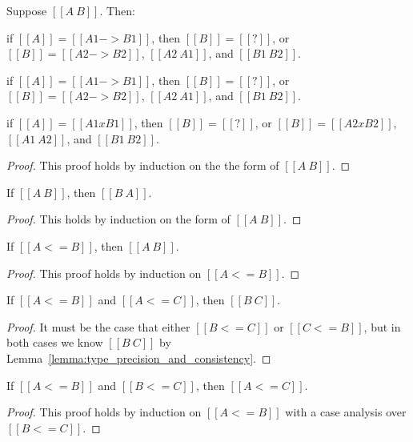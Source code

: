 \begin{lemma}
  \label{lemma:inversion_of_type_consistency}
  Suppose $[[A ~ B]]$. Then:
  \begin{enumR}\small
  \item if $[[A]] = [[A1 -> B1]]$, then $[[B]] = [[?]]$, or
    $[[B]] = [[A2 -> B2]]$, $[[A2 ~ A1]]$, and $[[B1 ~ B2]]$.
  \item if $[[A]] = [[A1 -> B1]]$, then $[[B]] = [[?]]$, or
    $[[B]] = [[A2 -> B2]]$, $[[A2 ~ A1]]$, and $[[B1 ~ B2]]$.
  \item if $[[A]] = [[A1 x B1]]$, then $[[B]] = [[?]]$, or
    $[[B]] = [[A2 x B2]]$, $[[A1 ~ A2]]$, and $[[B1 ~ B2]]$.
  \end{enumR}
\end{lemma}
\begin{proof}
  This proof holds by induction on the the form of $[[A ~ B]]$.
\end{proof}

\begin{lemma}
  \label{lemma:symmetry_for_type_consistency}
  If $[[A ~ B]]$, then $[[B ~ A]]$.
\end{lemma}
\begin{proof}
  This holds by induction on the form of $[[A ~ B]]$.
\end{proof}

\begin{lemma}
  \label{lemma:type_precision_and_consistency}
  If $[[A <= B]]$, then $[[A ~ B]]$.
\end{lemma}
\begin{proof}
  This proof holds by induction on $[[A <= B]]$.
\end{proof}

\begin{lemma}
  \label{lemma:type_precision_triangle_consistenty}  
  If $[[A <= B]]$ and $[[A <= C]]$, then $[[B ~ C]]$.
\end{lemma}
\begin{proof}
  It must be the case that either $[[B <= C]]$ or $[[C <= B]]$, but in both cases
  we know $[[B ~ C]]$ by Lemma~\ref{lemma:type_precision_and_consistency}.
\end{proof}

\begin{lemma}
  \label{lemma:transitivity_for_type_precision}
  If $[[A <= B]]$ and $[[B <= C]]$, then $[[A <= C]]$.
\end{lemma}
\begin{proof}
  This proof holds by induction on $[[A <= B]]$ with
  a case analysis over $[[B <= C]]$.
\end{proof}

